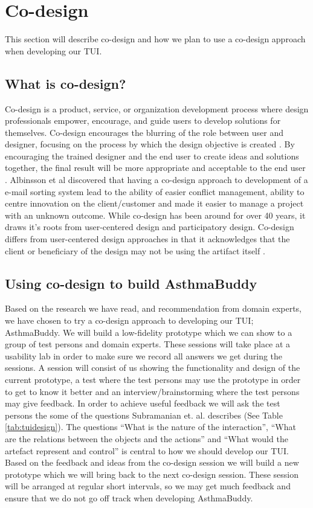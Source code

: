 \section{Co-design}
This section will describe co-design and how we plan to use a co-design approach when developing our TUI.

\subsection{What is co-design?}
Co-design is a product, service, or organization development process where design professionals empower, encourage, and guide users to develop solutions for themselves. Co-design encourages the blurring of the role between user and designer, focusing on the process by which the design objective is created \cite{sanders2008co}. By encouraging the trained designer and the end user to create ideas and solutions together, the final result will be more appropriate and acceptable to the end user \cite{albinsson2007co}. 
Albinsson et al \cite{albinsson2007co} discovered that having a co-design approach to development of a e-mail sorting system lead to the ability of easier conflict management, ability to centre innovation on the client/customer and made it easier to manage a project with an unknown outcome. While co-design has been around for over 40 years, it draws it's roots from user-centered design and participatory design. Co-design differs from user-centered design approaches in that it acknowledges that the client or beneficiary of the design may not be using the artifact itself \cite{norman1986user}.



\subsection{Using co-design to build AsthmaBuddy}
Based on the research we have read, and recommendation from domain experts, we have chosen to try a co-design approach to developing our TUI; AsthmaBuddy. We will build a low-fidelity prototype which we can show to a group of test persons and domain experts. These sessions will take place at a usability lab in order to make sure we record all answers we get during the sessions. A session will consist of us showing the functionality and design of the current prototype, a test where the test persons may use the prototype in order to get to know it better and an interview/brainstorming where the test persons may give feedback. In order to achieve useful feedback we will ask the test persons the some of the questions Subramanian et. al. describes (See Table \ref{tab:tuidesign}). The questions ``What is the nature of the interaction'', ``What are the relations between the objects and the actions'' and ``What would the artefact represent and control'' is central to how we should develop our TUI.
Based on the feedback and ideas from the co-design session we will build a new prototype which we will bring back to the next co-design session. These session will be arranged at regular short intervals, so we may get much feedback and ensure that we do not go off track when developing AsthmaBuddy.